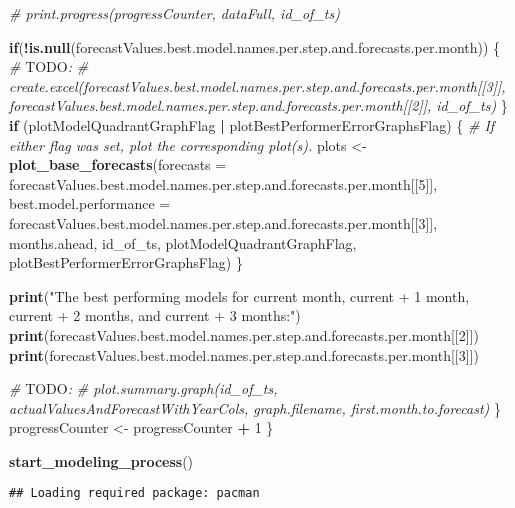 \documentclass[
]{article}
\newenvironment{Shaded}{\begin{snugshade}}{\end{snugshade}}
\newcommand{\AlertTok}[1]{\textcolor[rgb]{0.94,0.16,0.16}{#1}}
\newcommand{\AttributeTok}[1]{\textcolor[rgb]{0.13,0.29,0.53}{#1}}
\newcommand{\CommentTok}[1]{\textcolor[rgb]{0.56,0.35,0.01}{\textit{#1}}}
\newcommand{\ControlFlowTok}[1]{\textcolor[rgb]{0.13,0.29,0.53}{\textbf{#1}}}
\newcommand{\DecValTok}[1]{\textcolor[rgb]{0.00,0.00,0.81}{#1}}
\newcommand{\FunctionTok}[1]{\textcolor[rgb]{0.13,0.29,0.53}{\textbf{#1}}}
\newcommand{\NormalTok}[1]{#1}
\newcommand{\OtherTok}[1]{\textcolor[rgb]{0.56,0.35,0.01}{#1}}
\newcommand{\SpecialCharTok}[1]{\textcolor[rgb]{0.81,0.36,0.00}{\textbf{#1}}}
\newcommand{\StringTok}[1]{\textcolor[rgb]{0.31,0.60,0.02}{#1}}
\begin{document}
\begin{Shaded}
\begin{Highlighting}[]
    \CommentTok{\# print.progress(progressCounter, dataFull, id\_of\_ts)}
      
    \ControlFlowTok{if}\NormalTok{(}\SpecialCharTok{!}\FunctionTok{is.null}\NormalTok{(forecastValues.best.model.names.per.step.and.forecasts.per.month)) \{}
      \CommentTok{\# }\AlertTok{TODO}\CommentTok{:}
      \CommentTok{\# create.excel(forecastValues.best.model.names.per.step.and.forecasts.per.month[[3]], forecastValues.best.model.names.per.step.and.forecasts.per.month[[2]], id\_of\_ts)}
\NormalTok{    \}              }
    \ControlFlowTok{if}\NormalTok{ (plotModelQuadrantGraphFlag }\SpecialCharTok{|}\NormalTok{ plotBestPerformerErrorGraphsFlag) \{ }\CommentTok{\# If either flag was set, plot the corresponding plot(s).}
\NormalTok{      plots }\OtherTok{\textless{}{-}} \FunctionTok{plot\_base\_forecasts}\NormalTok{(}\AttributeTok{forecasts =}\NormalTok{ forecastValues.best.model.names.per.step.and.forecasts.per.month[[}\DecValTok{5}\NormalTok{]], }\AttributeTok{best.model.performance =}\NormalTok{ forecastValues.best.model.names.per.step.and.forecasts.per.month[[}\DecValTok{3}\NormalTok{]], months.ahead, id\_of\_ts, plotModelQuadrantGraphFlag, plotBestPerformerErrorGraphsFlag)}
\NormalTok{    \}}

    \FunctionTok{print}\NormalTok{(}\StringTok{"The best performing models for current month, current + 1 month, current + 2 months, and current + 3 months:"}\NormalTok{)}
    \FunctionTok{print}\NormalTok{(forecastValues.best.model.names.per.step.and.forecasts.per.month[[}\DecValTok{2}\NormalTok{]])}
    \FunctionTok{print}\NormalTok{(forecastValues.best.model.names.per.step.and.forecasts.per.month[[}\DecValTok{3}\NormalTok{]])}

    \CommentTok{\# }\AlertTok{TODO}\CommentTok{:}
    \CommentTok{\# plot.summary.graph(id\_of\_ts, actualValuesAndForecastWithYearCols, graph.filename, first.month.to.forecast)}
\NormalTok{  \}   }
\NormalTok{  progressCounter }\OtherTok{\textless{}{-}}\NormalTok{ progressCounter }\SpecialCharTok{+} \DecValTok{1}
\NormalTok{\}}
\end{Highlighting}
\end{Shaded}

\begin{Shaded}
\begin{Highlighting}[]
\FunctionTok{start\_modeling\_process}\NormalTok{()}
\end{Highlighting}
\end{Shaded}

\begin{verbatim}
## Loading required package: pacman
\end{verbatim}
\end{document}
